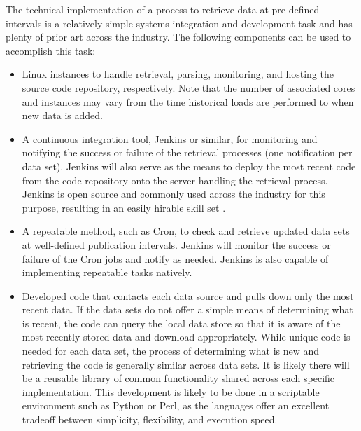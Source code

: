 The technical implementation of a process to retrieve data at pre-defined intervals is a relatively simple systems integration and development task and has plenty of prior art across the industry. The following components can be used to accomplish this task:
\begin{itemize}
	\item Linux instances to handle retrieval, parsing, monitoring, and hosting the source code repository, respectively. Note that the number of associated cores and instances may vary from the time historical loads are performed to when new data is added.
	\item A continuous integration tool, Jenkins or similar, for monitoring and notifying the success or failure of the retrieval processes (one notification per data set). Jenkins will also serve as the means to deploy the most recent code from the code repository onto the server handling the retrieval process. Jenkins is open source and commonly used across the industry for this purpose, resulting in an easily hirable skill set \cite{jenkins}.
	\item A repeatable method, such as Cron, to check and retrieve updated data sets at well-defined publication intervals. Jenkins will monitor the success or failure of the Cron jobs and notify as needed. Jenkins is also capable of implementing repeatable tasks natively.
	\item Developed code that contacts each data source and pulls down only the most recent data. If the data sets do not offer a simple means of determining what is recent, the code can query the local data store so that it is aware of the most recently stored data and download appropriately. While unique code is needed for each data set, the process of determining what is new and retrieving the code is generally similar across data sets. It is likely there will be a reusable library of common functionality shared across each specific implementation. This development is likely to be done in a scriptable environment such as Python or Perl, as the languages offer an excellent tradeoff between simplicity, flexibility, and execution speed.
\end{itemize}
